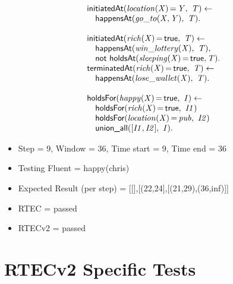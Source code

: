 \documentclass[8pt]{beamer}
\DeclareMathOperator{\val}{=}  %
\def \patsize {}
\def\happensAt{\textsf{\patsize happensAt}}
\def\holdsAt{\textsf{\patsize holdsAt}}
\def\holdsFor{\textsf{\patsize holdsFor}}
\def\initiatedAt{\textsf{\patsize initiatedAt}}
\def\terminatedAt{\textsf{\patsize terminatedAt}}
\def\unionall{\textsf{\patsize union\_all}}
\def\nbf{\textsf{\patsize not}}
\def\true{\textsf{\patsize true}}
\newenvironment{mysplit}%
  {\arraycolsep 0pt \begin{array}{l}}%
  {\end{array}}
\begin{document}
\begin{frame}
\begin{minipage}{0.48\linewidth}
        \begin{align*}
            \begin{mysplit}
                \initiatedAt\mathit{(location(X)\val Y,\ T) \leftarrow}\\
                \quad    \happensAt\mathit{(go\_to(X,Y),\ T).}\\\\
                \initiatedAt\mathit{(rich(X)\val\true,\ T) \leftarrow}\\
                \quad    \happensAt\mathit{(win\_lottery(X),\ T),}\\
                \quad    \nbf\ \holdsAt\mathit{(sleeping(X)\val\true,T)}.\\
                \terminatedAt\mathit{(rich(X)\val\true,\ T) \leftarrow}\\
                \quad    \happensAt\mathit{(lose\_wallet(X),\ T)}.\\\\
                \holdsFor\mathit{(happy(X)\val\true,\ I) \leftarrow}\\
                \quad    \holdsFor\mathit{(rich(X)\val\true,\ I1)}\\
                \quad    \holdsFor\mathit{(location(X)\val pub,\ I2)}\\
                \quad    \unionall\mathit{([I1,I2],\ I)}.
            \end{mysplit}
        \end{align*}
    \end{minipage}

    \begin{itemize}
        \item Step = 9, Window = 36, Time start = 9, Time end = 36
        \item Testing Fluent = happy(chris) 
        \item Expected Result (per step) = [[],[(22,24],[(21,29),(36,inf)]] 
        \item RTEC = passed
        \item RTECv2 = passed
    \end{itemize}
\end{frame}



\section{RTECv2 Specific Tests}
\end{document}

